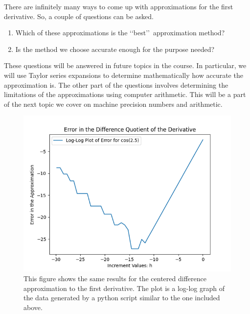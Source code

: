 \documentclass[10pt,fleqn]{article}
\begin{document}
There are infinitely many ways to come up with approximations for the first
derivative. So, a couple of questions can be asked.
\begin{enumerate}
  \item Which of these approximations is the \lq\lq best\rq\rq\ approximation
        method?
  \item Is the method we choose accurate enough for the purpose needed?
\end{enumerate}
These questions will be answered in future topics in the course. In particular,
we will use Taylor series expansions to determine mathematically how accurate
the approximation is. The other part of the questions involves determining the
limitations of the approximations using computer arithmetic. This will be a part
of the next topic we cover on machine precision numbers and arithmetic.
\vfill
\begin{figure}[h]
\centering
\includegraphics{../images/diff_quotient_02.png}
\vskip0.1in
\caption{This figure shows the same results for the centered difference
approximation to the first derivative. The plot is a log-log graph of the data
generated by a python script similar to the one included above.}
\end{figure}
\eject
\end{document}
